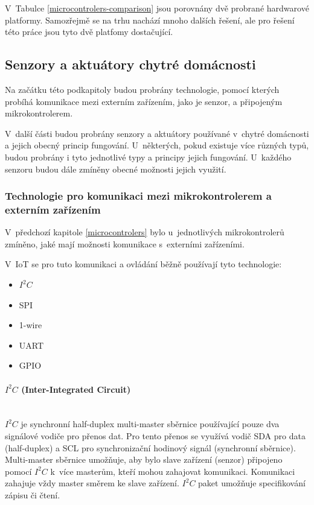 V~Tabulce \ref{microcontrolers-comparison} jsou porovnány dvě probrané hardwarové platformy. Samozřejmě se na trhu nachází mnoho dalších řešení, ale pro řešení této práce jsou tyto dvě platfomy dostačující.

\subsection*{Senzory a aktuátory chytré domácnosti} \label{hardware-theory}
Na začátku této podkapitoly budou probrány technologie, pomocí kterých probíhá komunikace mezi externím zařízením, jako je senzor, a připojeným mikrokontrolerem.

V~další části budou probrány senzory a aktuátory používané v~chytré domácnosti a jejich obecný princip fungování. U~některých, pokud existuje více různých typů, budou probrány i tyto jednotlivé typy a principy jejich fungování. U~každého senzoru budou dále zmíněny obecné možnosti jejich využití. 

\subsubsection*{Technologie pro komunikaci mezi mikrokontrolerem a externím zařízením}\label{microcontrolers-technologies}
V~předchozí kapitole \ref{microcontrolers} bylo u~jednotlivých mikrokontrolerů zmíněno, jaké mají možnosti komunikace s~externími zařízeními. 

\noindent V~IoT se pro tuto komunikaci a ovládání běžně používají tyto technologie\cite{protocols-compared}:
\begin{itemize}
  \item $I^2C$
  \item SPI
  \item 1-wire
  \item UART
  \item GPIO
  \end{itemize}

\paragraph*{$I^2C$ (Inter-Integrated Circuit)}\mbox{} \\
$I^2C$ je synchronní half-duplex multi-master sběrnice používající pouze dva signálové vodiče pro přenos dat. Pro tento přenos se využívá vodič SDA pro data (half-duplex) a SCL pro synchronizační hodinový signál (synchronní sběrnice). Multi-master sběrnice umožňuje, aby bylo slave zařízení (senzor) připojeno pomocí $I^2C$ k~více masterům, kteří mohou zahajovat komunikaci. Komunikaci zahajuje vždy master směrem ke slave zařízení. $I^2C$ paket umožňuje specifikování zápisu či čtení. 

